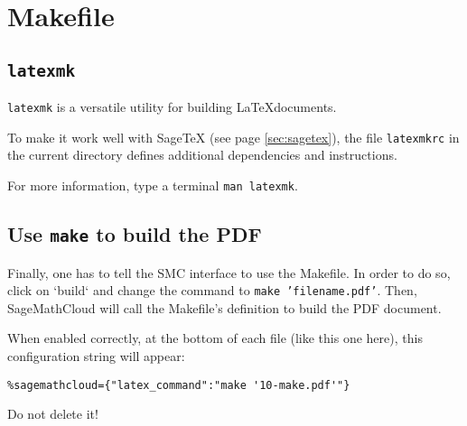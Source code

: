 \documentclass[master.tex]{subfiles}
\begin{document}
\chapter{Makefile}

\section{\texttt{latexmk}}

\texttt{latexmk} is a versatile utility for building \LaTeX documents.

To make it work well with SageTeX (see page \ref{sec:sagetex}),
the file \texttt{latexmkrc} in the current directory defines
additional dependencies and instructions.

For more information, type a terminal \texttt{man latexmk}.

\section{Use \texttt{make} to build the PDF}

Finally, one has to tell the SMC interface to use the Makefile.
In order to do so, click on `build` and change the
command to \texttt{make 'filename.pdf'}.
Then, SageMathCloud will call the Makefile's definition to build the PDF document.

When enabled correctly, at the bottom of each file (like this one here),
this configuration string will appear:

\begin{verbatim}
%sagemathcloud={"latex_command":"make '10-make.pdf'"}
\end{verbatim}

Do not delete it!
\end{document}
